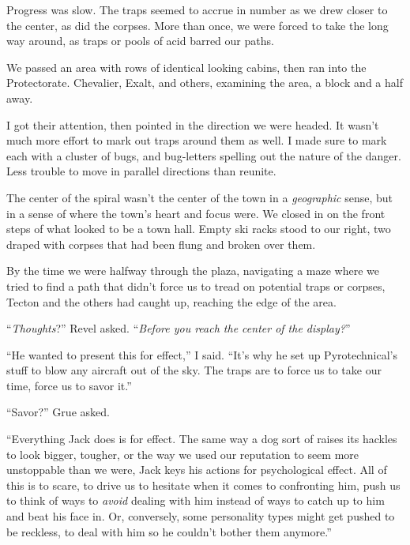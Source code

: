 Progress was slow.  The traps seemed to accrue in number as we drew closer to the center, as did the corpses.  More than once, we were forced to take the long way around, as traps or pools of acid barred our paths.



We passed an area with rows of identical looking cabins, then ran into the Protectorate.  Chevalier, Exalt, and others, examining the area, a block and a half away.



I got their attention, then pointed in the direction we were headed.  It wasn't much more effort to mark out traps around them as well.  I made sure to mark each with a cluster of bugs, and bug-letters spelling out the nature of the danger.  Less trouble to move in parallel directions than reunite.



The center of the spiral wasn't the center of the town in a \emph{geographic} sense, but in a sense of where the town's heart and focus were.  We closed in on the front steps of what looked to be a town hall.  Empty ski racks stood to our right, two draped with corpses that had been flung and broken over them.



By the time we were halfway through the plaza, navigating a maze where we tried to find a path that didn't force us to tread on potential traps or corpses, Tecton and the others had caught up, reaching the edge of the area.



``\emph{Thoughts}?'' Revel asked.  ``\emph{Before you reach the center of the display?}''



``He wanted to present this for effect,'' I said.  ``It's why he set up Pyrotechnical's stuff to blow any aircraft out of the sky.  The traps are to force us to take our time, force us to savor it.''



``Savor?'' Grue asked.



``Everything Jack does is for effect.  The same way a dog sort of raises its hackles to look bigger, tougher, or the way we used our reputation to seem more unstoppable than we were, Jack keys his actions for psychological effect.  All of this is to scare, to drive us to hesitate when it comes to confronting him, push us to think of ways to \emph{avoid} dealing with him instead of ways to catch up to him and beat his face in.  Or, conversely, some personality types might get pushed to be reckless, to deal with him so he couldn't bother them anymore.''



